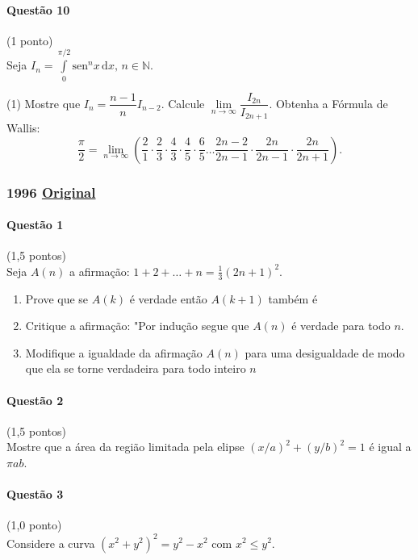 \documentclass[12pt,a4paper]{article}
\newcommand{\sen}{\mathrm{sen}}
\newcommand{\dd}{\mathrm{d}}
\newcommand{\original}[1]{\tiny \href{#1}{Original} \normalsize}
\begin{document}
\paragraph{Questão 10} (1 ponto)\\
Seja $I_n = \displaystyle \int \limits_0^{\pi /2}\sen ^n x\, \dd x,\, n\in \mathbb{N}$.
\begin{tasks}(1)
\task Mostre que $I_n = \dfrac{n-1}{n} I_{n-2}$.
\task Calcule $\lim\limits_{n\to \infty} \dfrac{I_{2n}}{I_{2n+1}}$.
\task Obtenha a Fórmula de Wallis:$$\dfrac{\pi}{2} = \lim\limits_{n\to \infty} \left( \frac{2}{1} \cdot \dfrac{2}{3} \cdot \dfrac{4}{3}\cdot \dfrac{4}{5} \cdot \frac{6}{5} \dots \dfrac{2n-2}{2n-1} \cdot \dfrac{2n}{2n-1}\cdot \dfrac{2n}{2n+1} \right).$$
\end{tasks}

\newpage

\subsubsection{1996 \original{https://drive.google.com/open?id=1UvvYZLaMSFs7J6LTwt3of2MU1M2tmELR}}

\paragraph{Questão 1} (1,5 pontos)\\
Seja $A(n)$ a afirmação: $1+2+\dots + n = \frac{1}{3}(2n+1)^2$.
\begin{enumerate}[label=(\alph*)]
\item Prove que se $A(k)$ é verdade então $A(k+1)$ também é
\item Critique a afirmação: "Por indução segue que $A(n)$ é verdade para todo $n$.
\item Modifique a igualdade da afirmação $A(n)$ para uma desigualdade de modo que ela se torne verdadeira para todo inteiro $n$
\end{enumerate}

\paragraph{Questão 2} (1,5 pontos)\\
Mostre que a área da região limitada pela elipse $(x/a)^2 + (y/b)^2 = 1$ é igual a $\pi ab$.

\paragraph{Questão 3} (1,0 ponto)\\
Considere a curva $(x^2 + y^2)^2 = y^2-x^2$ com $x^2 \le y^2$.
\end{document}
